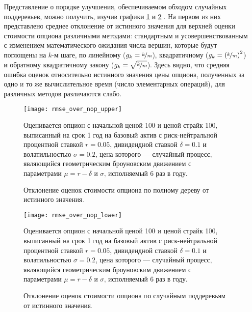 Представление о порядке улучшения, обеспечиваемом обходом случайных поддеревьев, можно получить, изучив графики \ref{fig:rmse_over_nop_upper} и \ref{fig:rmse_over_nop_lower} . На первом из них представлено среднее отклонение от истинного значения для верхней оценки стоимости опциона различными методами: стандартным и усовершенствованным с изменением математического ожидания числа вершин, которые будут поглощены на $k$-м шаге, по линейному ($g_k = \nicefrac{k}{m}$), квадратичному ($g_k = \left(\nicefrac{k}{m}\right)^2$) и обратному квадратичному закону ($g_k = \sqrt{\nicefrac{k}{m}}$). Здесь видно, что средняя ошибка оценок относительно истинного значения цены опциона, полученных за одно и то же вычислительное время (число элементарных операций), для различных методов различаются слабо. 
\begin{figure}[HtPb]
    \centering
	\texttt{[image: rmse\_over\_nop\_upper]}
	\caption{Отклонение оценок стоимости опциона по полному дереву от истинного значения.}
	\label{fig:rmse_over_nop_upper}
	\footnotesize{Оценивается опцион с начальной ценой 100 и ценой страйк 100, выписанный на срок 1 год на базовый актив с риск-нейтральной процентной ставкой $r = 0.05$, дивидендной ставкой $\delta = 0.1$ и волатильностью $\sigma=0.2$, цена которого --- случайный процесс, являющийся геометрическим броуновским движением с параметрами $\mu = r - \delta$ и $\sigma$, исполняемый 6 раз в году.}
\end{figure}
\begin{figure}[HtPb]
    \centering
	\texttt{[image: rmse\_over\_nop\_lower]}
	\caption{Отклонение оценок стоимости опциона по случайным поддеревьям от истинного значения.}
	\label{fig:rmse_over_nop_lower}
	\footnotesize{Оценивается опцион с начальной ценой 100 и ценой страйк 100, выписанный на срок 1 год на базовый актив с риск-нейтральной процентной ставкой $r = 0.05$, дивидендной ставкой $\delta = 0.1$ и волатильностью $\sigma=0.2$, цена которого --- случайный процесс, являющийся геометрическим броуновским движением с параметрами $\mu = r - \delta$ и $\sigma$, исполняемый 6 раз в году.}
\end{figure}
